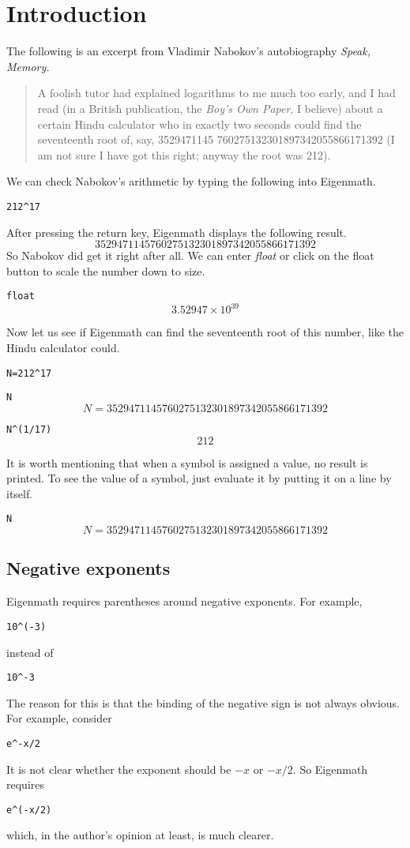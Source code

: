 \section{Introduction}
The following is an excerpt from Vladimir Nabokov's
autobiography {\it Speak, Memory.}
\begin{quote}
A foolish tutor had explained logarithms to me much too early, and I had
read (in a British publication, the {\it Boy's Own Paper}, I believe)
about a certain Hindu calculator who in exactly two seconds could find the
seventeenth root of, say,
3529471145 760275132301897342055866171392
(I am not sure I have got this right; anyway the root was 212).
\end{quote}
We can check Nabokov's arithmetic by typing the following into Eigenmath.

\medskip
\verb$212^17$

\medskip
\noindent
After pressing the return key, Eigenmath displays the following result.
$$3529471145760275132301897342055866171392$$
So Nabokov did get it right after all.
We can enter {\it float} or click on the float button to scale the number
down to size.

\medskip
\verb$float$
$$3.52947\times10^{39}$$

\medskip
\noindent
Now let us see if Eigenmath can find the
seventeenth root of this number, like the Hindu calculator could.

\medskip
\verb$N=212^17$

\verb$N$
$$N=3529471145760275132301897342055866171392$$

\verb$N^(1/17)$
$$212$$

\medskip
\noindent
It is worth mentioning that when a symbol is assigned a value,
no result is printed.
To see the value of a symbol, just evaluate it by putting it on a line by
itself.

\medskip
\verb$N$
$$N=3529471145760275132301897342055866171392$$

\newpage

\subsection{Negative exponents}
Eigenmath requires parentheses around negative exponents.
For example,

\medskip
\verb$10^(-3)$

\medskip
\noindent
instead of

\medskip
\verb$10^-3$

\medskip
\noindent
The reason for this is that the binding of the negative sign is not always
obvious.
For example, consider

\medskip
\verb$e^-x/2$

\medskip
\noindent
It is not clear whether the exponent should be $-x$ or $-x/2$.
So Eigenmath requires

\medskip
\verb$e^(-x/2)$

\medskip
\noindent
which, in the author's opinion at least, is much clearer.
